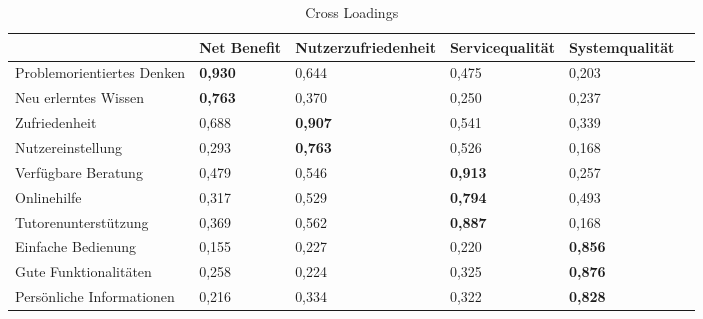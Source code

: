 \begin{table}[h] 
\footnotesize
\caption{Cross Loadings}
\label{tab:Cross-Loadings} 
\begin{tabular}{@{}llllll@{}} \toprule

 & \textbf{Net Benefit} & \textbf{Nutzerzufriedenheit} & \textbf{Servicequalität} & \textbf{Systemqualität} \\ \midrule

Problemorientiertes Denken 	& \textbf{0,930}	& 0,644	& 0,475	& 0,203	\\

Neu erlerntes Wissen	& \textbf{0,763}	& 0,370 	& 0,250 	& 0,237	\\ 

Zufriedenheit 			& 0,688 		& \textbf{0,907} & 0,541	& 0,339	\\

Nutzereinstellung		& 0,293		& \textbf{0,763}	 & 0,526 & 0,168 \\
 
Verfügbare Beratung		& 0,479 		& 0,546 	&\textbf{0,913}	& 0,257		\\

Onlinehilfe 			& 0,317 		& 0,529	& \textbf{0,794}	& 0,493 		\\

Tutorenunterstützung	& 0,369 		& 0,562 	& \textbf{0,887}	& 0,168		\\ 

Einfache Bedienung		& 0,155 		& 0,227 	& 0,220	& \textbf{0,856}	\\ 

Gute Funktionalitäten 	& 0,258 		& 0,224	& 0,325	& \textbf{0,876} 		\\ 
 
Persönliche Informationen & 0,216 	& 0,334 	& 0,322	& \textbf{0,828}	\\	
		 
 \bottomrule
 
\end{tabular}	
\end{table}










